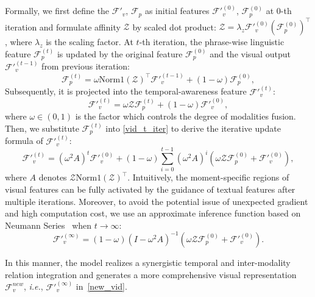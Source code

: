 Formally, we first define the $\mathcal{F'}_v$, $\mathcal{F}_p$ as initial features $\mathcal{F'}_v^{(0)}$, $\mathcal{F}_p^{(0)}$ at $0$-th iteration and formulate affinity $\mathcal{Z}$ by scaled dot product: $\mathcal{Z}=\lambda_{z}\mathcal{F'}_v^{(0)} (\mathcal{F}_p^{(0)})^{\top }$, where $\lambda_{z}$ is the scaling factor.
At $t$-th iteration, the phrase-wise linguistic feature $\mathcal{F}_p^{(t)}$ is updated by the original feature $\mathcal{F}_p^{(0)}$ and the visual output $\mathcal{F'}_v^{(t-1)}$ from previous iteration: 
\begin{equation}
    \label{txt_t_iter}
    \mathcal{F}_p^{(t)}=\omega \mathrm{Norm1}(\mathcal{Z})^{\top }\mathcal{F'}_v^{(t-1)}+(1-\omega )\mathcal{F}_p^{(0)},
\end{equation}
Subsequently, it is projected into the temporal-awareness feature $\mathcal{F'}_{v}^{(t)}$:
\begin{equation}
    \label{vid_t_iter}
    \mathcal{F'}_v^{(t)}=\omega \mathcal{Z}\mathcal{F}_p^{(t)} + (1-\omega )\mathcal{F'}_v^{(0)},
\end{equation}
where $\omega \in (0,1)$ is the factor which controls the degree of modalities fusion.
Then, we substitute $\mathcal{F}_p^{(t)}$ into \cref{vid_t_iter} to derive the iterative update formula of $\mathcal{F'}_v^{(t)}$:
\begin{equation}
    \mathcal{F'}_v^{(t)} = (\omega^2A)^{t} \mathcal{F'}_v^{(0)} + (1-\omega )\sum_{i=0}^{t-1} (\omega^2A)^{i}(\omega \mathcal{Z}\mathcal{F}_p^{(0)}+\mathcal{F'}_v^{(0)}),
\end{equation}
where $A$ denotes $\mathcal{Z}\mathrm{Norm1}(\mathcal{Z})^{\top}$. Intuitively, the moment-specific regions of visual features can be fully activated by the guidance of textual features after multiple iterations.
Moreover, to avoid the potential issue of unexpected gradient and high computation cost, we use an approximate inference function based on Neumann Series~\cite{neuman} when $t \to \infty$:
\begin{equation}
    \label{new_vid}
    \mathcal{F'}_v^{(\infty )}=(1-\omega )(I-\omega ^2 A)^{-1}(\omega \mathcal{Z} \mathcal{F}_p^{(0)}+ \mathcal{F'}_v^{(0)}).
\end{equation}

In this manner, the model realizes a synergistic temporal and inter-modality relation integration and generates a more comprehensive visual representation $\mathcal{F}_v^{new}$, \textit{i.e.}, $\mathcal{F'}_v^{(\infty )}$ in~\cref{new_vid}.

